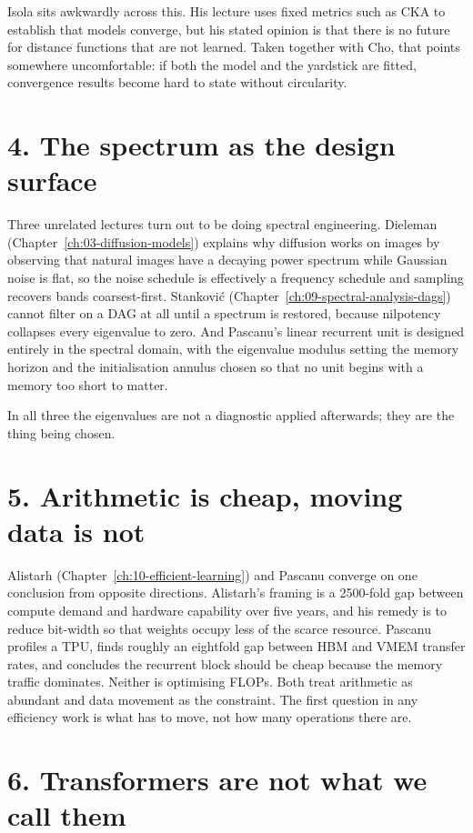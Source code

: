 Isola sits awkwardly across this. His lecture uses fixed metrics such as CKA to establish that
models converge, but his stated opinion is that there is no future for distance functions that are
not learned. Taken together with Cho, that points somewhere uncomfortable: if both the model and
the yardstick are fitted, convergence results become hard to state without circularity.

\section*{4. The spectrum as the design surface}

Three unrelated lectures turn out to be doing spectral engineering. Dieleman
(Chapter~\ref{ch:03-diffusion-models}) explains why diffusion works on images by observing that
natural images have a decaying power spectrum while Gaussian noise is flat, so the noise schedule is
effectively a frequency schedule and sampling recovers bands coarsest-first. Stankovi\'{c}
(Chapter~\ref{ch:09-spectral-analysis-dags}) cannot filter on a DAG at all until a spectrum is
restored, because nilpotency collapses every eigenvalue to zero. And Pascanu's linear recurrent unit
is designed entirely in the spectral domain, with the eigenvalue modulus setting the memory horizon
and the initialisation annulus chosen so that no unit begins with a memory too short to matter.

In all three the eigenvalues are not a diagnostic applied afterwards; they are the thing being
chosen.

\section*{5. Arithmetic is cheap, moving data is not}

Alistarh (Chapter~\ref{ch:10-efficient-learning}) and Pascanu converge on one conclusion from
opposite directions. Alistarh's framing is a 2500-fold gap between compute demand and hardware
capability over five years, and his remedy is to reduce bit-width so that weights occupy less of the
scarce resource. Pascanu profiles a TPU, finds roughly an eightfold gap between HBM and VMEM
transfer rates, and concludes the recurrent block should be cheap because the memory traffic
dominates. Neither is optimising FLOPs. Both treat arithmetic as abundant and data movement as the
constraint. The first question in any efficiency work is what has to move, not how many operations
there are.

\section*{6. Transformers are not what we call them}

